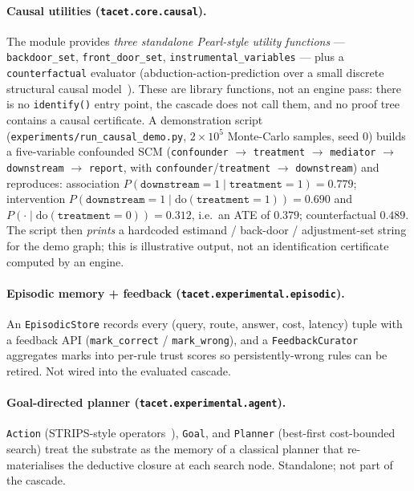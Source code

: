 \documentclass[11pt]{article}
\theoremstyle{plain}
\begin{document}
\paragraph{Causal utilities (\texttt{tacet.core.causal}).}
The module provides \emph{three standalone Pearl-style utility functions} ---
\texttt{backdoor\_set}, \texttt{front\_door\_set}, \texttt{instrumental\_variables}
--- plus a \texttt{counterfactual} evaluator (abduction-action-prediction over a
small discrete structural causal model~\citep{pearl2009causality}). These are
library functions, not an engine pass: there is no \texttt{identify()} entry
point, the cascade does not call them, and no proof tree contains a causal
certificate. A demonstration script
(\texttt{experiments/run\_causal\_demo.py}, $2{\times}10^{5}$ Monte-Carlo
samples, seed $0$) builds a five-variable confounded SCM (\texttt{confounder}
$\rightarrow$ \texttt{treatment} $\rightarrow$ \texttt{mediator} $\rightarrow$
\texttt{downstream} $\rightarrow$ \texttt{report}, with
\texttt{confounder}/\texttt{treatment} $\rightarrow$ \texttt{downstream}) and
reproduces: association
$P(\texttt{downstream}{=}1\mid\texttt{treatment}{=}1)=0.779$; intervention
$P(\texttt{downstream}{=}1\mid\mathrm{do}(\texttt{treatment}{=}1))=0.690$ and
$P(\cdot\mid\mathrm{do}(\texttt{treatment}{=}0))=0.312$, i.e.\ an ATE of $0.379$;
counterfactual $0.489$. The script then \emph{prints} a hardcoded estimand /
back-door / adjustment-set string for the demo graph; this is illustrative
output, not an identification certificate computed by an engine.

\paragraph{Episodic memory + feedback (\texttt{tacet.experimental.episodic}).}
An \texttt{EpisodicStore} records every (query, route, answer, cost, latency)
tuple with a feedback API (\texttt{mark\_correct} / \texttt{mark\_wrong}), and a
\texttt{FeedbackCurator} aggregates marks into per-rule trust scores so
persistently-wrong rules can be retired. Not wired into the evaluated cascade.

\paragraph{Goal-directed planner (\texttt{tacet.experimental.agent}).}
\texttt{Action} (STRIPS-style operators~\citep{fikes1971strips}),
\texttt{Goal}, and \texttt{Planner} (best-first cost-bounded search) treat the
substrate as the memory of a classical planner that re-materialises the
deductive closure at each search node. Standalone; not part of the cascade.
\end{document}
